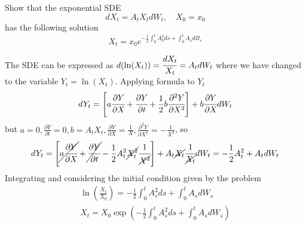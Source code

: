 \documentclass[12pt,a4paper]{exam}
\begin{document}
\begin{questions}
\question Show that the exponential SDE
\begin{equation*}
dX_t = A_t X_tdW_t,\quad X_0=x_0
\end{equation*}
has the following solution
\begin{equation*}
X_t = x_0 e^{-\frac{1}{2}\int_0^t A_0^2 ds+\int_0^t A_s dB_s}
\end{equation*}
\fillwithlines{3cm}
\begin{solution}
The SDE can be expressed as $d(\ln(X_t)) = \cfrac{dX_t}{X_t} = A_t dW_t$ where we have changed to the variable $Y_t = \ln(X_t)$. Applying \ito formula to $Y_t$ 
\begin{equation*}
dY_t = \left[a\cfrac{\partial Y}{\partial X} + \cfrac{\partial Y}{\partial t} + \frac{1}{2}b\cfrac{\partial^2 Y}{\partial X^2}\right]+ b\cfrac{\partial Y}{\partial X}dW_t
\end{equation*}
but $a=0, \frac{\partial Y}{\partial t}=0, b=A_tX_t, \frac{\partial Y}{\partial X}=\frac{1}{X}, \frac{\partial^2 Y}{\partial X^2}=-\frac{1}{X^2}$, so
\begin{equation*}
dY_t = \left[\cancel{a\cfrac{\partial Y}{\partial X}} + \cancel{\cfrac{\partial Y}{\partial t}} - \frac{1}{2}A_t^2 \cancel{X_t^2}\cfrac{1}{\cancel{X^2}}\right]+ A_t\cancel{X_t}\cfrac{1}{\cancel{X_t}}dW_t = -\frac{1}{2}A_t^2 + A_t dW_t
\end{equation*}
Integrating and considering the initial condition given by the problem
\begin{equation*}
\begin{gathered}
\ln\left(\frac{X_t}{X_0}\right) = -\frac{1}{2}\int_0^t A_s^2 ds + \int_0^tA_s dW_s \\
X_t = X_0 \exp\left(-\frac{1}{2}\int_0^t A_s^2 ds + \int_0^tA_s dW_s \right)
\end{gathered}
\end{equation*}
%
%
%
%
%
%
%
%
%
%
%
%
\end{solution}


\end{questions}
\end{document}
